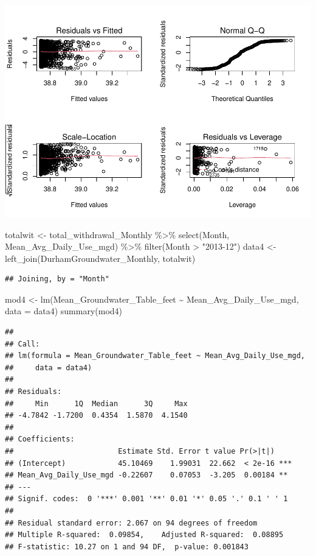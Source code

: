 \documentclass[
  12pt,
]{article}
\newenvironment{Shaded}{\begin{snugshade}}{\end{snugshade}}
\newcommand{\AttributeTok}[1]{\textcolor[rgb]{0.77,0.63,0.00}{#1}}
\newcommand{\FunctionTok}[1]{\textcolor[rgb]{0.00,0.00,0.00}{#1}}
\newcommand{\NormalTok}[1]{#1}
\newcommand{\OtherTok}[1]{\textcolor[rgb]{0.56,0.35,0.01}{#1}}
\newcommand{\SpecialCharTok}[1]{\textcolor[rgb]{0.00,0.00,0.00}{#1}}
\newcommand{\StringTok}[1]{\textcolor[rgb]{0.31,0.60,0.02}{#1}}
\begin{document}
\includegraphics{Project_files/figure-latex/groundwater and precipitation-1.pdf}

\begin{Shaded}
\begin{Highlighting}[]
\NormalTok{totalwit }\OtherTok{\textless{}{-}}\NormalTok{ total\_withdrawal\_Monthly }\SpecialCharTok{\%\textgreater{}\%}
  \FunctionTok{select}\NormalTok{(Month, Mean\_Avg\_Daily\_Use\_mgd) }\SpecialCharTok{\%\textgreater{}\%}
  \FunctionTok{filter}\NormalTok{(Month }\SpecialCharTok{\textgreater{}} \StringTok{"2013{-}12"}\NormalTok{)}
\NormalTok{data4 }\OtherTok{\textless{}{-}} \FunctionTok{left\_join}\NormalTok{(DurhamGroundwater\_Monthly, totalwit) }
\end{Highlighting}
\end{Shaded}

\begin{verbatim}
## Joining, by = "Month"
\end{verbatim}

\begin{Shaded}
\begin{Highlighting}[]
\NormalTok{mod4 }\OtherTok{\textless{}{-}} \FunctionTok{lm}\NormalTok{(Mean\_Groundwater\_Table\_feet }\SpecialCharTok{\textasciitilde{}}\NormalTok{ Mean\_Avg\_Daily\_Use\_mgd, }\AttributeTok{data =}\NormalTok{ data4)}
\FunctionTok{summary}\NormalTok{(mod4)}
\end{Highlighting}
\end{Shaded}

\begin{verbatim}
## 
## Call:
## lm(formula = Mean_Groundwater_Table_feet ~ Mean_Avg_Daily_Use_mgd, 
##     data = data4)
## 
## Residuals:
##     Min      1Q  Median      3Q     Max 
## -4.7842 -1.7200  0.4354  1.5870  4.1540 
## 
## Coefficients:
##                        Estimate Std. Error t value Pr(>|t|)    
## (Intercept)            45.10469    1.99031  22.662  < 2e-16 ***
## Mean_Avg_Daily_Use_mgd -0.22607    0.07053  -3.205  0.00184 ** 
## ---
## Signif. codes:  0 '***' 0.001 '**' 0.01 '*' 0.05 '.' 0.1 ' ' 1
## 
## Residual standard error: 2.067 on 94 degrees of freedom
## Multiple R-squared:  0.09854,    Adjusted R-squared:  0.08895 
## F-statistic: 10.27 on 1 and 94 DF,  p-value: 0.001843
\end{verbatim}
\end{document}
